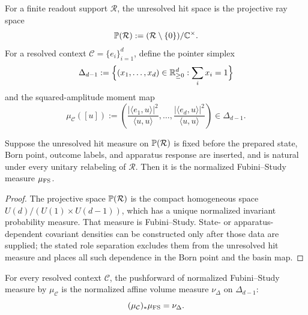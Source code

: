 \documentclass[12pt,a4paper]{article}
\begin{document}
\begin{definition}
\label{p4:def:projective-hit-simplex}
For a finite readout support \(\mathcal R\), the unresolved hit space is the
projective ray space
\[
        \mathbb{P}(\mathcal R)
        :=(\mathcal R\setminus\{0\})/\mathbb{C}^\times .
\]
For a resolved context \(\mathcal C=\{e_i\}_{i=1}^d\), define the pointer simplex
\[
        \Delta_{d-1}
        :=\Bigl\{(x_1,\ldots,x_d)\in\mathbb{R}_{\ge0}^d:
        \sum_i x_i=1\Bigr\}
\]
and the squared-amplitude moment map
\begin{equation}
\label{p4:eq:projective-hit-moment-map}
        \mu_{\mathcal C}([u])
        :=
        \left(
        \frac{|\langle e_1,u\rangle|^2}{\langle u,u\rangle},
        \ldots,
        \frac{|\langle e_d,u\rangle|^2}{\langle u,u\rangle}
        \right)
        \in \Delta_{d-1} .
\end{equation}
\end{definition}

\begin{lemma}
\label{p4:lem:no-insertion-hit-measure}
Suppose the unresolved hit measure on \(\mathbb{P}(\mathcal R)\) is fixed before the
prepared state, Born point, outcome labels, and apparatus response are inserted, and
is natural under every unitary relabeling of \(\mathcal R\).  Then it is the normalized
Fubini--Study measure \(\mu_{\rm FS}\).
\end{lemma}

\begin{proof}
The projective space \(\mathbb{P}(\mathcal R)\) is the compact homogeneous space
\(U(d)/(U(1)\times U(d-1))\), which has a unique normalized invariant probability
measure.  That measure is Fubini--Study.  State- or apparatus-dependent covariant
densities can be constructed only after those data are supplied; the stated role
separation excludes them from the unresolved hit measure and places all such
dependence in the Born point and the basin map.
\end{proof}

\begin{lemma}
\label{p4:lem:fs-simplex-pushforward}
For every resolved context \(\mathcal C\), the pushforward of normalized
Fubini--Study measure by \(\mu_{\mathcal C}\) is the normalized affine volume
measure \(\nu_{\Delta}\) on \(\Delta_{d-1}\):
\[
        (\mu_{\mathcal C})_*\mu_{\rm FS}=\nu_{\Delta}.
\]
\end{lemma}
\end{document}
